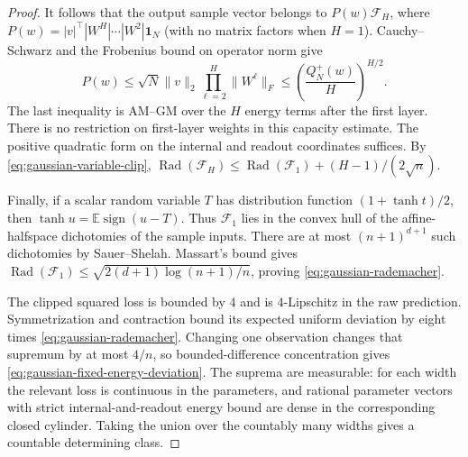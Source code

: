 \begin{proof}
It follows that the output sample vector belongs to
$P(w)\mathcal F_H$, where
$P(w)=|v|^\top|W^H|\cdots|W^2|\boldsymbol1_N$ (with no matrix factors
when $H=1$).  Cauchy--Schwarz and the Frobenius bound on operator norm give
\[
 P(w)\leq\sqrt N\|v\|_2\prod_{\ell=2}^H\|W^\ell\|_F
 \leq\left(\frac{Q_N^+(w)}H\right)^{H/2}.
\]
The last inequality is AM--GM over the $H$ energy terms after the first
layer.  There is no restriction on first-layer weights in this capacity estimate. The positive quadratic form on the internal and readout coordinates suffices.
By \eqref{eq:gaussian-variable-clip},
$\operatorname{Rad}(\mathcal F_H)\leq
\operatorname{Rad}(\mathcal F_1)+(H-1)/(2\sqrt n)$.

Finally, if a scalar random variable $T$ has distribution function
$(1+\tanh t)/2$, then $\tanh u=\mathbb E\operatorname{sign}(u-T)$.
Thus $\mathcal F_1$ lies in the convex hull of the affine-halfspace
dichotomies of the sample inputs.  There are at most $(n+1)^{d+1}$ such
dichotomies by Sauer--Shelah.  Massart's bound gives
$\operatorname{Rad}(\mathcal F_1)
\leq\sqrt{2(d+1)\log(n+1)/n}$, proving
\eqref{eq:gaussian-rademacher}.

The clipped squared loss is bounded by $4$ and is $4$-Lipschitz in the
raw prediction.  Symmetrization and contraction bound its expected
uniform deviation by eight times
\eqref{eq:gaussian-rademacher}.  Changing one observation changes that
supremum by at most $4/n$, so bounded-difference concentration gives
\eqref{eq:gaussian-fixed-energy-deviation}.
The suprema are measurable: for each width the relevant loss is
continuous in the parameters, and rational parameter vectors with strict internal-and-readout energy bound are dense in the corresponding closed cylinder.  Taking the
union over the countably many widths gives a countable determining
class.
\end{proof}

